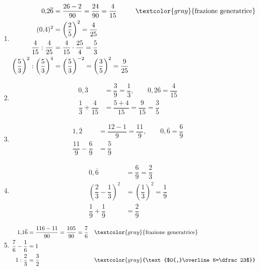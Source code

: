 \begin{question}[ID=3.1, subtitle={Espressioni con numeri periodici}, tags={espressioni, periodici}, difficulty=media]
\begin{explanation}
\begin{enumerate}
\[\begin{aligned}
    1{,}2-\dfrac2{15} &= \dfrac65-\dfrac2{15}=\dfrac{18-2}{15}=\dfrac{16}{15}
    \end{aligned}\]
    \item \[\begin{aligned}
    0{,}2\overline{6} &= \dfrac{26-2}{90}=\dfrac{24}{90}=\dfrac4{15} && \textcolor{gray}{\text{frazione generatrice}}\\
    (0{,}4)^2 &= \left(\dfrac25\right)^2=\dfrac4{25}\\
    \dfrac4{15}:\dfrac4{25} &= \dfrac4{15}\cdot\dfrac{25}4=\dfrac53\\
    \left(\dfrac53\right)^2:\left(\dfrac53\right)^4 &= \left(\dfrac53\right)^{-2}=\left(\dfrac35\right)^2=\dfrac{9}{25}
    \end{aligned}\]
    \item \[\begin{aligned}
    0{,}\overline{3} &= \dfrac39=\dfrac13, \qquad 0{,}2\overline{6}=\dfrac4{15}\\
    \dfrac13+\dfrac4{15} &= \dfrac{5+4}{15}=\dfrac{9}{15}=\dfrac35
    \end{aligned}\]
    \item \[\begin{aligned}
    1{,}\overline{2} &= \dfrac{12-1}{9}=\dfrac{11}9, \qquad 0{,}\overline{6}=\dfrac69\\
    \dfrac{11}9-\dfrac69 &= \dfrac59
    \end{aligned}\]
    \item \[\begin{aligned}
    0{,}\overline{6} &= \dfrac69=\dfrac23\\
    \left(\dfrac23-\dfrac13\right)^2 &= \left(\dfrac13\right)^2=\dfrac19\\
    \dfrac19+\dfrac19 &= \dfrac29
    \end{aligned}\]
    \item \[\begin{aligned}
    1{,}1\overline{6} &= \dfrac{116-11}{90}=\dfrac{105}{90}=\dfrac76 && \textcolor{gray}{\text{frazione generatrice}}\\
    \dfrac76-\dfrac16 &= 1\\
    1:\dfrac23 &= \dfrac32 && \textcolor{gray}{\text{$0{,}\overline6=\dfrac23$}}
    \end{aligned}\]
\end{enumerate}
\end{explanation}
\end{question}